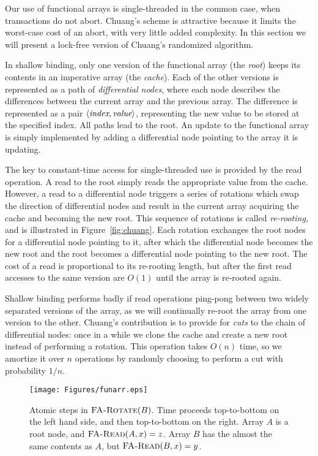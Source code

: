 \documentclass[preprint]{rdbacmconf}
\newcommand{\funcname}[1]{\ensuremath{\text{\sc #1}}}
\newcommand{\tuple}[1]{\ensuremath{\left\langle #1 \right\rangle}}
\begin{document}
Our use of functional arrays is single-threaded in the common case,
when transactions do not abort.  Chuang's scheme is attractive because
it limits the worst-case cost of an abort, with very little added
complexity.   In this section we will present a lock-free version of
Chuang's randomized algorithm.

In shallow binding, only one version of the functional array (the
\emph{root}) keeps its contents in an imperative array (the
\emph{cache}).   Each of the other versions is represented as a path
of \emph{differential nodes}, where each node describes the
differences between the current array and the previous array.  The
difference is represented as a pair \tuple{\text{\it index},\text{\it value}},
representing the new value to be stored at the specified index.
All paths lead to the root.  An update to the functional array is
simply implemented by adding a differential node pointing to the array it is
updating.

The key to constant-time access for single-threaded use is provided by the read
operation.  A read to the root simply reads the appropriate value from
the cache.  However, a read to a differential node triggers a series
of rotations which swap the direction of differential nodes and result
in the current array acquiring the cache and becoming the new root.
This sequence of rotations is called \emph{re-rooting}, and is
illustrated in Figure~\ref{fig:chuang}.  Each rotation
exchanges the root nodes for a differential node pointing to it, after
which the differential node becomes the new root and the root becomes
a differential node pointing to the new root. The cost of a read is
proportional to its re-rooting length, but after the first read
accesses to the same version are $O(1)$ until the array is re-rooted again.

Shallow binding performs badly if read operations ping-pong between two
widely separated versions of the array, as we will continually
re-root the array from one version to the other.
Chuang's contribution is to provide for \emph{cuts} to the chain of
differential nodes: once in a while we clone the cache and create a
new root instead of performing a rotation.  This operation takes
$O(n)$ time, so we amortize it over $n$ operations by randomly
choosing to perform a cut with probability $1/n$.

\begin{figure*}\centering
\texttt{[image: Figures/funarr.eps]}
\caption{Atomic steps in $\funcname{FA-Rotate}(B)$.  Time proceeds top-to-bottom
  on the left hand side, and then top-to-bottom on the right.
  Array $A$ is a root node, and $\funcname{FA-Read}(A, x)=z$.
  Array $B$ has the almost the same contents as $A$, but
  $\funcname{FA-Read}(B, x)=y$.}
\label{fig:funarr}
\end{figure*}
\end{document}
